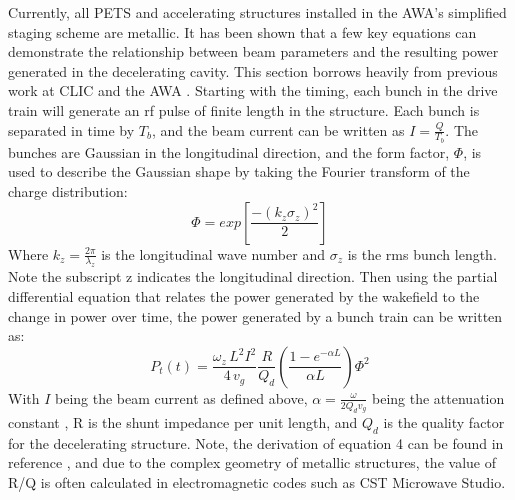 Currently, all  PETS and accelerating structures installed in the AWA's
simplified staging scheme are metallic. It has been shown that a few
key equations can demonstrate the relationship between beam parameters
and the resulting power generated in the decelerating cavity. This section
borrows heavily from previous work at CLIC and the AWA \cite{CLICdesignReport,WeiPaper}. 
Starting with the timing, each bunch in the drive train will generate
an rf pulse of finite length in the structure. Each bunch is separated
in time by $T_{b}$, and the  beam current can be written as $I=\frac{Q}{T_{b}}$.
 The bunches are Gaussian in the longitudinal direction, and the form
factor, $\Phi$, is used to describe the Gaussian shape by taking
the Fourier transform of the charge distribution: 
\begin{equation}
\Phi=exp\left[\frac{-(k_{z}\sigma_{z})^{2}}{2}\right]
\end{equation}
Where $k_{z}=\frac{2\pi}{\lambda_{z}}$ is the longitudinal wave number
and $\sigma_{z}$ is the rms bunch length.   Note the subscript z indicates the longitudinal
direction. Then using the partial differential equation that relates
the power generated by the wakefield to the change in power over time, 
the power generated by a bunch train can be written as:
\begin{equation} \label{eq:rfpower}
P_{t}(t)=\frac{\omega_{z}\,L^{2}I^{2}}{4\,v_{g}}\frac{R}{Q_{d}}\left(\frac{1-e^{-\alpha L}}{\alpha L}\right)\Phi^{2}
\end{equation}
With $I$ being the beam current as defined above, $\alpha=\frac{\omega}{2Q_{d}v_{g}}$
being the attenuation constant \cite{pozar}, R is the shunt impedance
per unit length, and $Q_{d}$ is the quality factor for the decelerating
structure.  Note, the derivation of equation 4 can be found in reference
\cite{PETSeq}, and due to the complex geometry of metallic structures,
the value of R/Q is often calculated in electromagnetic codes such
as CST Microwave Studio. 



